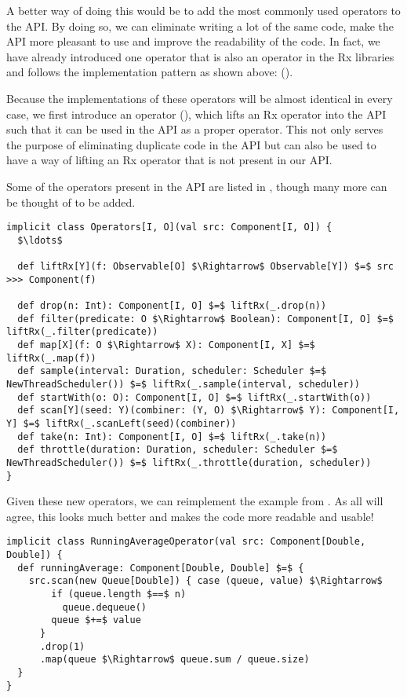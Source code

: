 A better way of doing this would be to add the most commonly used operators to the \comp API. By doing so, we can eliminate writing a lot of the same code, make the API more pleasant to use and improve the readability of the code. In fact, we have already introduced one operator that is also an operator in the Rx libraries and follows the implementation pattern as shown above:  ().

Because the implementations of these operators will be almost identical in every case, we first introduce an operator  (), which lifts an Rx operator into the \comp API such that it can be used in the API as a proper operator. This not only serves the purpose of eliminating duplicate code in the API but can also be used to have a way of lifting an Rx operator that is not present in our API.

Some of the operators present in the API are listed in , though many more can be thought of to be added.

\begin{lstlisting}[style=ScalaStyle, caption={Rx style operators}, label={lst:rx-style-operators}]
implicit class Operators[I, O](val src: Component[I, O]) {
  $\ldots$

  def liftRx[Y](f: Observable[O] $\Rightarrow$ Observable[Y]) $=$ src >>> Component(f)
  
  def drop(n: Int): Component[I, O] $=$ liftRx(_.drop(n))
  def filter(predicate: O $\Rightarrow$ Boolean): Component[I, O] $=$ liftRx(_.filter(predicate))
  def map[X](f: O $\Rightarrow$ X): Component[I, X] $=$ liftRx(_.map(f))
  def sample(interval: Duration, scheduler: Scheduler $=$ NewThreadScheduler()) $=$ liftRx(_.sample(interval, scheduler))
  def startWith(o: O): Component[I, O] $=$ liftRx(_.startWith(o))
  def scan[Y](seed: Y)(combiner: (Y, O) $\Rightarrow$ Y): Component[I, Y] $=$ liftRx(_.scanLeft(seed)(combiner))
  def take(n: Int): Component[I, O] $=$ liftRx(_.take(n))
  def throttle(duration: Duration, scheduler: Scheduler $=$ NewThreadScheduler()) $=$ liftRx(_.throttle(duration, scheduler))
}
\end{lstlisting}

Given these new operators, we can reimplement the  example from . As all will agree, this looks much better and makes the code more readable and usable!

\begin{lstlisting}[style=ScalaStyle, caption={Implementation of \code{RunningAverage} using the new Rx style operators}, label={lst:running-average-with-operators}]
implicit class RunningAverageOperator(val src: Component[Double, Double]) {
  def runningAverage: Component[Double, Double] $=$ {
    src.scan(new Queue[Double]) { case (queue, value) $\Rightarrow$
        if (queue.length $==$ n)
          queue.dequeue()
        queue $+=$ value
      }
      .drop(1)
      .map(queue $\Rightarrow$ queue.sum / queue.size)
  }
}
\end{lstlisting}

